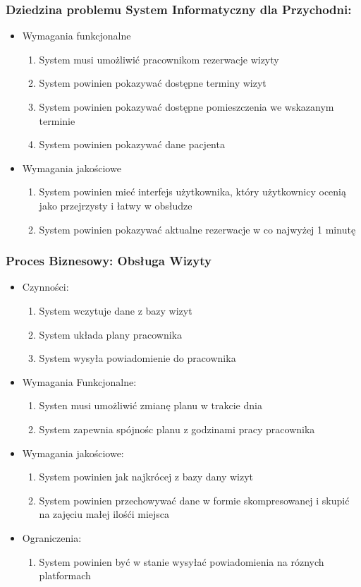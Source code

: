 \documentclass{article}
\begin{document}
	\subsubsection*{Dziedzina problemu System Informatyczny dla Przychodni:}
	\begin{itemize}
		\item Wymagania funkcjonalne
		\begin{enumerate}
			\item System musi umożliwić pracownikom rezerwacje wizyty
			\item System powinien pokazywać dostępne terminy wizyt
			\item System powinien pokazywać dostępne pomieszczenia we wskazanym terminie
			\item System powinien pokazywać dane pacjenta
		\end{enumerate}
		\item Wymagania jakościowe
		\begin{enumerate}
			\item System powinien mieć interfejs użytkownika, który użytkownicy ocenią jako przejrzysty i łatwy w obsłudze
			\item System powinien pokazywać aktualne rezerwacje w co najwyżej 1 minutę
		\end{enumerate}
		
	\end{itemize}
	\subsubsection*{Proces Biznesowy: Obsługa Wizyty}
	\begin{itemize}
		\item Czynności:
			\begin{enumerate}
				\item System wczytuje dane z bazy wizyt
				\item System układa plany pracownika
				\item System wysyła powiadomienie do pracownika
			\end{enumerate}
		\item Wymagania Funkcjonalne:
			\begin{enumerate}
				\item Systen musi umożliwić zmianę planu w trakcie dnia
				\item System zapewnia spójnośc planu z godzinami pracy pracownika
			\end{enumerate}
		\item Wymagania jakościowe:
			\begin{enumerate}
				\item System powinien jak najkrócej z bazy dany wizyt
				\item System powinien przechowywać dane w formie skompresowanej i skupić na zajęciu małej ilośći miejsca
			\end{enumerate}
		\item Ograniczenia:
			\begin{enumerate}
				\item System powinien być w stanie wysyłać powiadomienia na róznych platformach
			\end{enumerate}
	\end{itemize}
	\newpage
\end{document}
